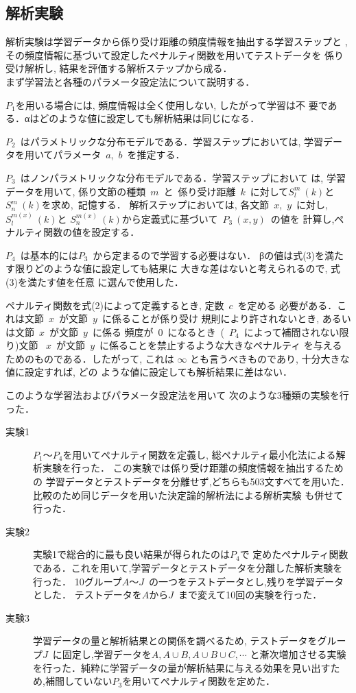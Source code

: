 \subsection{解析実験}
解析実験は学習データから係り受け距離の頻度情報を抽出する学習ステップと
, その頻度情報に基づいて設定したペナルティ関数を用いてテストデータを
係り受け解析し, 結果を評価する解析ステップから成る．\\
まず学習法と各種のパラメータ設定法について説明する．

$P_1$を用いる場合には, 頻度情報は全く使用しない, したがって学習は不
要である．αはどのような値に設定しても解析結果は同じになる．

$P_2$\ はパラメトリックな分布モデルである．学習ステップにおいては,
 学習データを用いてパラメータ\ $a$,\ $b$\ を推定する．

$P_3$\ はノンパラメトリックな分布モデルである．学習ステップにおいて
は, 学習データを用いて, 係り文節の種類\ $m$\ と\ 係り受け距離\ $k$\ に対して$S_l^{m}\ (k)$と
$S_n^{m}\ (k)$を求め,\ 記憶する．
解析ステップにおいては, 各文節\ $x$,\ $y$\ に対し,\ $S_l^{m(x)}\ (k)$と
$S_n^{m(x)}\ (k)$から定義式に基づいて\ $P_3\ (x,y)$\ の値を
計算し,ペナルティ関数の値を設定する．

$P_4$\ は基本的には$P_3$\ から定まるので学習する必要はない．
βの値は式(3)を満たす限りどのような値に設定しても結果に
大きな差はないと考えられるので, 式(3)を満たす値を任意
に選んで使用した．

ペナルティ関数を式(2)によって定義するとき, 定数\ $c$\ を定める
必要がある．これは文節\ $x$\ が文節\ $y$\ に係ることが係り受け
規則により許されないとき, あるいは文節\  $x$\ が文節\ $y$\ に係る
頻度が\ 0\ になるとき\ (\ $P_4$\ によって補間されない限り)文節
\ $x$\ が文節\ $y$\ に係ることを禁止するような大きなペナルティ
を与えるためのものである．したがって, これは  $\infty$ 
とも言うべきものであり, 十分大きな値に設定すれば, どの
ような値に設定しても解析結果に差はない．

このような学習法およびパラメータ設定法を用いて
次のような3種類の実験を行った．

\begin{description}
\item[実験1] $P_1$〜$P_4$を用いてぺナルティ関数を定義し,
総ペナルティ最小化法による解析実験を行った．
この実験では係り受け距離の頻度情報を抽出するための
学習データとテストデータを分離せず,どちらも503文すべてを用いた．
比較のため同じデータを用いた決定論的解析法による解析実験
も併せて行った．

\item[実験2] 実験1で総合的に最も良い結果が得られたのは$P_4$\hspace{-0.25mm}で
定めたぺナルティ関数である．これを用いて,学習データとテストデータを分離した解析実験を行った．
10グループ$A〜J$\ の一つをテストデータとし,残りを学習データとした．
テストデータを$AからJ$\ まで変えて10回の実験を行った．

\item[実験3] 学習データの量と解析結果との関係を調べるため,
テストデータをグループ$J$\ に固定し,学習データを$A,A \cup B,A \cup  B \cup C, \cdots  $
と漸次増加させる実験を行った．純粋に学習データの量が解析結果に与える効果を見い出すため,補間していない$P_3$を用いてぺナルティ関数を定めた．
\end{description}
